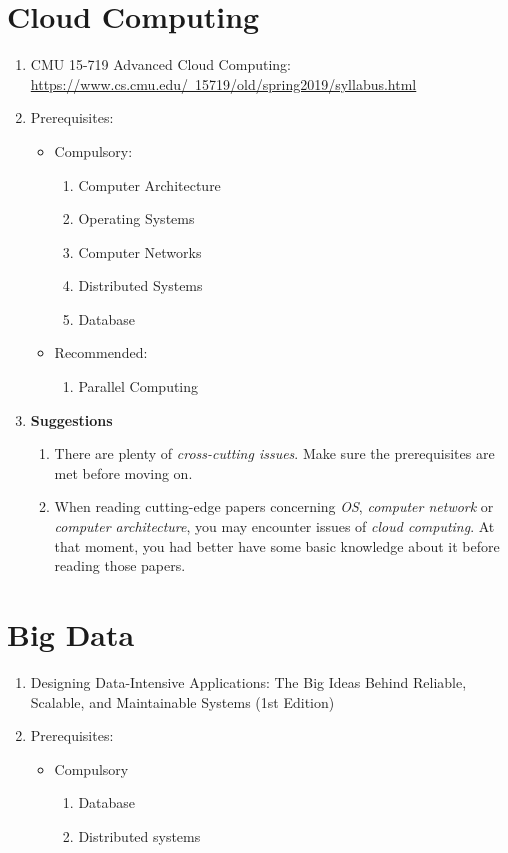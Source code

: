 \documentclass{article}
\begin{document}
\section{Cloud Computing}
\begin{enumerate}
    \item CMU 15-719 Advanced Cloud Computing:\\
    \href{https://www.cs.cmu.edu/~15719/old/spring2019/syllabus.html}{https://www.cs.cmu.edu/~15719/old/spring2019/syllabus.html}
    \item Prerequisites:
    \begin{itemize}
        \item Compulsory:
        \begin{enumerate}
            \item Computer Architecture
            \item Operating Systems
            \item Computer Networks
            \item Distributed Systems
            \item Database
        \end{enumerate}
        \item Recommended:
        \begin{enumerate}
            \item Parallel Computing
        \end{enumerate}
    \end{itemize}
    \item \textbf{Suggestions}
    \begin{enumerate}
        \item There are plenty of \emph{cross-cutting issues}.
        Make sure the prerequisites are met before moving on.
        \item When reading cutting-edge papers concerning \emph{OS}, \emph{computer network} or \emph{computer architecture}, you may encounter issues of \emph{cloud computing}.
        At that moment, you had better have some basic knowledge about it before reading those papers.
    \end{enumerate}
\end{enumerate}

\section{Big Data}
\begin{enumerate}
    \item Designing Data-Intensive Applications: The Big Ideas Behind Reliable, Scalable, and Maintainable Systems (1st Edition) \cite{kleppmann2017designing}
    \item Prerequisites:
    \begin{itemize}
        \item Compulsory
        \begin{enumerate}
            \item Database
            \item Distributed systems
        \end{enumerate}
    \end{itemize}
\end{enumerate}
\end{document}

